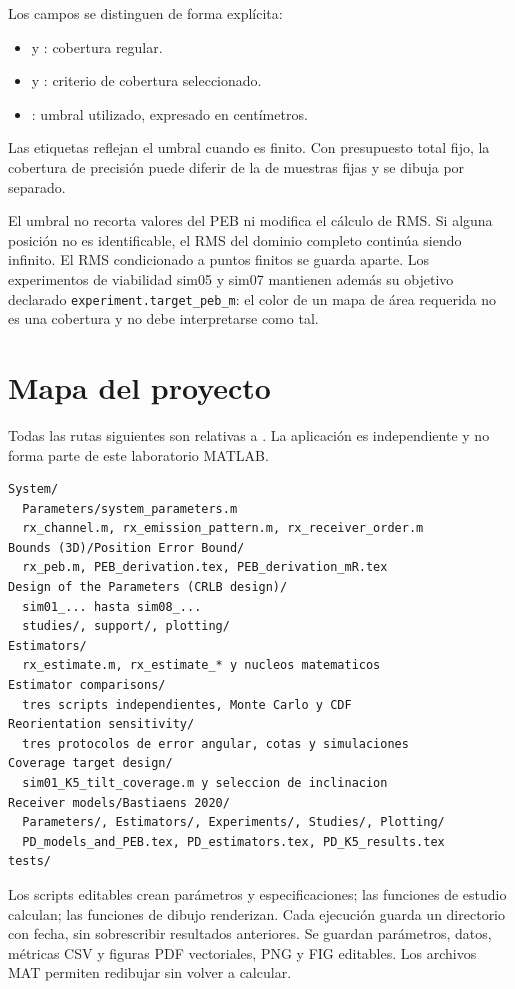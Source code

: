 \documentclass[11pt,a4paper]{article}
\begin{document}
Los campos se distinguen de forma explícita:
\begin{itemize}
\item {} y : cobertura regular.
\item {} y : criterio de cobertura seleccionado.
\item {}: umbral utilizado, expresado en centímetros.
\end{itemize}
Las etiquetas reflejan el umbral cuando es finito. Con presupuesto total fijo, la cobertura de precisión puede diferir de la de muestras fijas y se dibuja por separado.

El umbral no recorta valores del PEB ni modifica el cálculo de RMS. Si alguna posición no es identificable, el RMS del dominio completo continúa siendo infinito. El RMS condicionado a puntos finitos se guarda aparte. Los experimentos de viabilidad sim05 y sim07 mantienen además su objetivo declarado \texttt{experiment.target\_peb\_m}: el color de un mapa de área requerida no es una cobertura y no debe interpretarse como tal.

\section{Mapa del proyecto}
Todas las rutas siguientes son relativas a . La aplicación  es independiente y no forma parte de este laboratorio MATLAB.
\begin{verbatim}
System/
  Parameters/system_parameters.m
  rx_channel.m, rx_emission_pattern.m, rx_receiver_order.m
Bounds (3D)/Position Error Bound/
  rx_peb.m, PEB_derivation.tex, PEB_derivation_mR.tex
Design of the Parameters (CRLB design)/
  sim01_... hasta sim08_...
  studies/, support/, plotting/
Estimators/
  rx_estimate.m, rx_estimate_* y nucleos matematicos
Estimator comparisons/
  tres scripts independientes, Monte Carlo y CDF
Reorientation sensitivity/
  tres protocolos de error angular, cotas y simulaciones
Coverage target design/
  sim01_K5_tilt_coverage.m y seleccion de inclinacion
Receiver models/Bastiaens 2020/
  Parameters/, Estimators/, Experiments/, Studies/, Plotting/
  PD_models_and_PEB.tex, PD_estimators.tex, PD_K5_results.tex
tests/
\end{verbatim}
Los scripts editables crean parámetros y especificaciones; las funciones de estudio calculan; las funciones de dibujo renderizan. Cada ejecución guarda un directorio con fecha, sin sobrescribir resultados anteriores. Se guardan parámetros, datos, métricas CSV y figuras PDF vectoriales, PNG y FIG editables. Los archivos MAT permiten redibujar sin volver a calcular.
\end{document}
